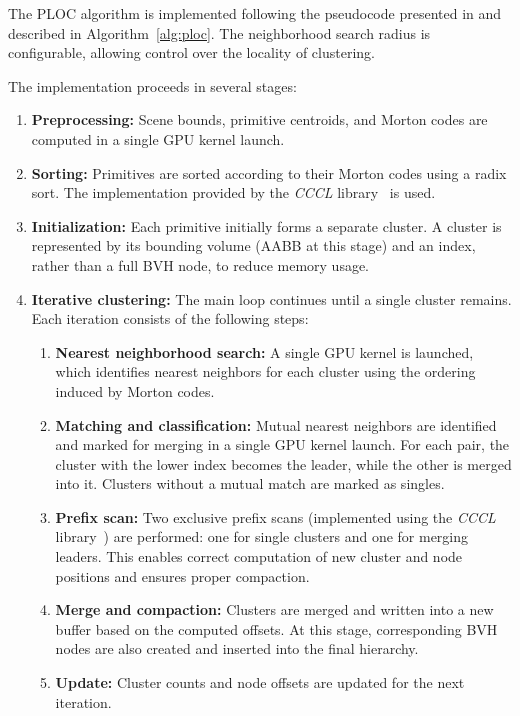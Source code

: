 The PLOC algorithm is implemented following the pseudocode presented in \cite{MB17} and described in Algorithm~\ref{alg:ploc}. The neighborhood search radius is configurable, allowing control over the locality of clustering.

The implementation proceeds in several stages:

\begin{enumerate}
    \item \textbf{Preprocessing:} Scene bounds, primitive centroids, and Morton codes are computed in a single GPU kernel launch.
    
    \item \textbf{Sorting:} Primitives are sorted according to their Morton codes using a radix sort. The implementation provided by the \textit{CCCL} library~\cite{nvidia_cccl} is used.
    
    \item \textbf{Initialization:} Each primitive initially forms a separate cluster. A cluster is represented by its bounding volume (AABB at this stage) and an index, rather than a full BVH node, to reduce memory usage.
    
    \item \textbf{Iterative clustering:} The main loop continues until a single cluster remains. Each iteration consists of the following steps:
    
    \begin{enumerate}
        \item \textbf{Nearest neighborhood search:} A single GPU kernel is launched, which identifies nearest neighbors for each cluster using the ordering induced by Morton codes.
        
        \item \textbf{Matching and classification:} Mutual nearest neighbors are identified and marked for merging in a single GPU kernel launch. For each pair, the cluster with the lower index becomes the leader, while the other is merged into it. Clusters without a mutual match are marked as singles.
        
        \item \textbf{Prefix scan:} Two exclusive prefix scans (implemented using the \textit{CCCL} library~\cite{nvidia_cccl}) are performed: one for single clusters and one for merging leaders. This enables correct computation of new cluster and node positions and ensures proper compaction.
        
        \item \textbf{Merge and compaction:} Clusters are merged and written into a new buffer based on the computed offsets. At this stage, corresponding BVH nodes are also created and inserted into the final hierarchy.
        
        \item \textbf{Update:} Cluster counts and node offsets are updated for the next iteration.
    \end{enumerate}
\end{enumerate}

